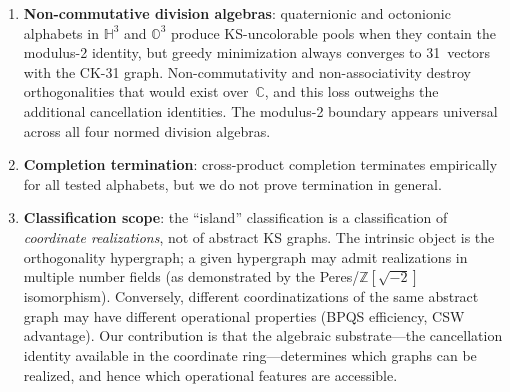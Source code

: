 \documentclass[12pt,a4paper]{article}
\newcommand{\C}{\mathbb{C}}
\newcommand{\Z}{\mathbb{Z}}
\newcommand{\Q}{\mathbb{Q}}
\begin{document}
\begin{enumerate}
    Additionally, we tested three quartic fields $\Q(d^{1/4})$ for $d = 2, 3, 5$ with extended alphabets including all powers $\{d^{1/4}, d^{1/2}, d^{3/4}\}$: only $d = 2$ is uncolorable (minimum 33 vectors), consistent with the $\sqrt{2}$ modulus-2 mechanism. We also surveyed 28 two-generator alphabets formed from pairs of $\{\sqrt{2}, \sqrt{3}, \sqrt{5}, \varphi, \omega, \sqrt{-2}, i, (1{+}\sqrt{-7})/2\}$: 22 of 28 are uncolorable.  Among the 17 pairs achieving minimum~33, VF2 isomorphism testing reveals exactly two graph classes: 13~pairs containing a modulus-2 generator ($\sqrt{2}$ or~$\sqrt{-2}$) produce the Peres graph (degree distribution $\{4{:}30, 8{:}3\}$, 72~pairs, 16~triads), while 4~pairs containing $\omega$ produce the Eisenstein graph ($\{4{:}18, 5{:}12, 8{:}3\}$, 78~pairs, 14~triads).  The 3~pairs achieving minimum~43 (all containing the Heegner-7 generator) are mutually graph-isomorphic.  This confirms that the cancellation identity, not the ambient field, determines the orthogonality graph.  Six pairs are colorable: those pairing $i$, $\varphi$, $\sqrt{3}$, or $\sqrt{5}$ without any modulus-2 or phase-cancellation generator.
    \item \textbf{Non-commutative division algebras}: quaternionic and octonionic alphabets in $\mathbb{H}^3$ and $\mathbb{O}^3$ produce KS-uncolorable pools when they contain the modulus-2 identity, but greedy minimization always converges to 31~vectors with the CK-31 graph.  Non-commutativity and non-associativity destroy orthogonalities that would exist over~$\C$, and this loss outweighs the additional cancellation identities.  The modulus-2 boundary appears universal across all four normed division algebras.\label{rem:division-algebras}
    \item \textbf{Completion termination}: cross-product completion terminates empirically for all tested alphabets, but we do not prove termination in general.
    \item \textbf{Classification scope}: the ``island'' classification is a classification of \emph{coordinate realizations}, not of abstract KS graphs. The intrinsic object is the orthogonality hypergraph; a given hypergraph may admit realizations in multiple number fields (as demonstrated by the Peres/$\Z[\sqrt{-2}]$ isomorphism). Conversely, different coordinatizations of the same abstract graph may have different operational properties (BPQS efficiency, CSW advantage). Our contribution is that the algebraic substrate---the cancellation identity available in the coordinate ring---determines which graphs can be realized, and hence which operational features are accessible.

\end{enumerate}
\end{document}
